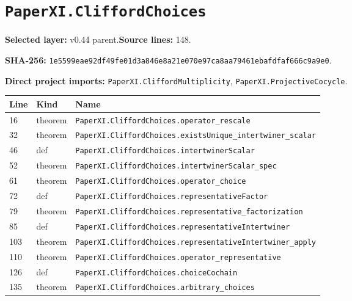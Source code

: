 \documentclass[10pt,oneside]{book}
\begin{document}
\section{\texorpdfstring{\nolinkurl{PaperXI.CliffordChoices}}{PaperXI.CliffordChoices}}\label{module:PaperXI.CliffordChoices}

\textbf{Selected layer:} v0.44 parent.\quad\textbf{Source lines:} 148.\par\textbf{SHA-256:} {\scriptsize\nolinkurl{1e5599eae92df49fe01d3a846e8a21e070e97ca8aa79461ebafdfaf666c9a9e0}}.


\textbf{Direct project imports:} \nolinkurl{PaperXI.CliffordMultiplicity}, \nolinkurl{PaperXI.ProjectiveCocycle}.

\begin{longtable}{@{}p{}p{}p{}@{}}\toprule Line&Kind&Name\\\midrule\endhead

16&theorem&\nolinkurl{PaperXI.CliffordChoices.operator_rescale}\\

32&theorem&\nolinkurl{PaperXI.CliffordChoices.existsUnique_intertwiner_scalar}\\

46&def&\nolinkurl{PaperXI.CliffordChoices.intertwinerScalar}\\

52&theorem&\nolinkurl{PaperXI.CliffordChoices.intertwinerScalar_spec}\\

61&theorem&\nolinkurl{PaperXI.CliffordChoices.operator_choice}\\

72&def&\nolinkurl{PaperXI.CliffordChoices.representativeFactor}\\

79&theorem&\nolinkurl{PaperXI.CliffordChoices.representative_factorization}\\

85&def&\nolinkurl{PaperXI.CliffordChoices.representativeIntertwiner}\\

103&theorem&\nolinkurl{PaperXI.CliffordChoices.representativeIntertwiner_apply}\\

110&theorem&\nolinkurl{PaperXI.CliffordChoices.operator_representative}\\

126&def&\nolinkurl{PaperXI.CliffordChoices.choiceCochain}\\

135&theorem&\nolinkurl{PaperXI.CliffordChoices.arbitrary_choices}\\

\bottomrule\end{longtable}
\end{document}
